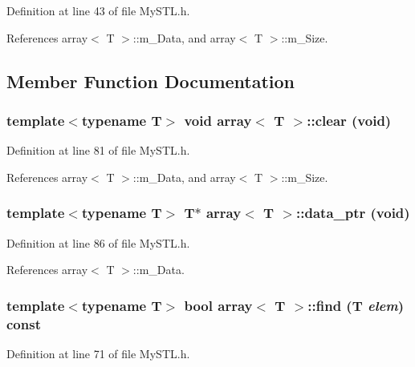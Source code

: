 Definition at line 43 of file MySTL.h.



References array$<$ T $>$::m\_\-Data, and array$<$ T $>$::m\_\-Size.



\subsection{Member Function Documentation}
\subsubsection[{clear}]{\setlength{\rightskip}{0pt plus 5cm}template$<$typename T$>$ void {\bf array}$<$ T $>$::clear (void)}\label{classarray_a55f66a2540b5f7633cc74b11ee18fb0c}


Definition at line 81 of file MySTL.h.



References array$<$ T $>$::m\_\-Data, and array$<$ T $>$::m\_\-Size.

\subsubsection[{data\_\-ptr}]{\setlength{\rightskip}{0pt plus 5cm}template$<$typename T$>$ T$\ast$ {\bf array}$<$ T $>$::data\_\-ptr (void)}\label{classarray_af56fad8278e10237d7bc90651d544e6f}


Definition at line 86 of file MySTL.h.



References array$<$ T $>$::m\_\-Data.

\subsubsection[{find}]{\setlength{\rightskip}{0pt plus 5cm}template$<$typename T$>$ bool {\bf array}$<$ T $>$::find (T {\em elem}) const}\label{classarray_a2a54cfb298552e30c53121d5a12b8045}


Definition at line 71 of file MySTL.h.



